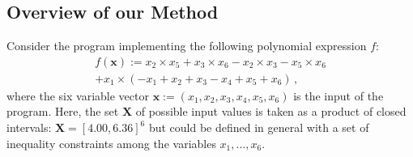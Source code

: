 \documentclass[preprint]{sigplanconf}
\newcommand{\x}{\mathbf{x}}
\def\X{\mathbf{X}}
\theoremstyle{plain}
\begin{document}
\subsection{Overview of our Method}
%
Consider the program implementing the following polynomial expression $f$:
\begin{align*}
f(\x) := x_2 \times x_5 + x_3 \times x_6 - x_2 \times x_3  - x_5 \times x_6 \\
+ x_1 \times ( - x_1 +  x_2 +  x_3  - x_4 +  x_5 +  x_6) \,,
\end{align*}
%
where the six variable vector $\x :=  (x_1, x_2, x_3, x_4, x_5, x_6)$ is the input of the program. Here, the set $\X$ of possible input values is taken as a product of closed intervals: $\X = [4.00, 6.36]^6$ but could be defined in general with a set of inequality constraints among the variables $x_1, \dots, x_6$. 
\end{document}
